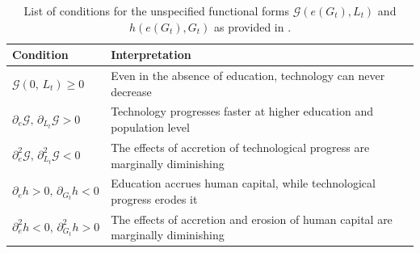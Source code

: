 \documentclass[a4paper,fleqn]{cas-sc}
\begin{document}
\begin{table}[width=\linewidth,cols=2,pos=t]
\caption{List of conditions for the unspecified functional forms $\mathcal G(e(G_t), L_t)$ and $h(e(G_t),G_t)$ as provided in \citet{Galor2000}.}\label{table:conditions}
\begin{tabular*}{\tblwidth}{@{} LL@{} }
\toprule
Condition & Interpretation \\
\midrule
$\mathcal{G}(0,\,L_t)\geq0$ & Even in the absence of education, technology can never decrease \\
$\partial_{e}\mathcal{G},\,\partial_{L_t}\mathcal{G}>0$ & Technology progresses faster at higher education and population level \\
$\partial^2_{e}\mathcal{G},\,\partial^2_{L_t}\mathcal{G}<0$ & The effects of accretion of technological progress are marginally diminishing \\
$\partial_{e}h>0,\,\partial_{G_t}h<0$ & Education accrues human capital, while technological progress erodes it\\
$\partial^2_{e}h<0,\,\partial^2_{G_t}h>0$ & The effects of accretion and erosion of human capital are marginally diminishing \\
\bottomrule
\end{tabular*}
\end{table}
\end{document}
